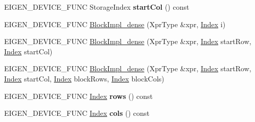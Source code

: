 \begin{DoxyCompactItemize}
\item 
\mbox{\label{class_eigen_1_1internal_1_1_block_impl__dense_afa5798a61fe753fb0ded7ec54b3d0812}} 
E\+I\+G\+E\+N\+\_\+\+D\+E\+V\+I\+C\+E\+\_\+\+F\+U\+NC Storage\+Index {\bfseries start\+Col} () const
\item 
E\+I\+G\+E\+N\+\_\+\+D\+E\+V\+I\+C\+E\+\_\+\+F\+U\+NC \hyperlink{class_eigen_1_1internal_1_1_block_impl__dense_af68c0eafb607bb884cfe507bee39052e}{Block\+Impl\+\_\+dense} (Xpr\+Type \&xpr, \hyperlink{namespace_eigen_a62e77e0933482dafde8fe197d9a2cfde}{Index} i)
\item 
E\+I\+G\+E\+N\+\_\+\+D\+E\+V\+I\+C\+E\+\_\+\+F\+U\+NC \hyperlink{class_eigen_1_1internal_1_1_block_impl__dense_aa77daae8d8aef85ce9445cfd23363cbf}{Block\+Impl\+\_\+dense} (Xpr\+Type \&xpr, \hyperlink{namespace_eigen_a62e77e0933482dafde8fe197d9a2cfde}{Index} start\+Row, \hyperlink{namespace_eigen_a62e77e0933482dafde8fe197d9a2cfde}{Index} start\+Col)
\item 
E\+I\+G\+E\+N\+\_\+\+D\+E\+V\+I\+C\+E\+\_\+\+F\+U\+NC \hyperlink{class_eigen_1_1internal_1_1_block_impl__dense_a187c7918e6f200bf1d7d9a9c2f608547}{Block\+Impl\+\_\+dense} (Xpr\+Type \&xpr, \hyperlink{namespace_eigen_a62e77e0933482dafde8fe197d9a2cfde}{Index} start\+Row, \hyperlink{namespace_eigen_a62e77e0933482dafde8fe197d9a2cfde}{Index} start\+Col, \hyperlink{namespace_eigen_a62e77e0933482dafde8fe197d9a2cfde}{Index} block\+Rows, \hyperlink{namespace_eigen_a62e77e0933482dafde8fe197d9a2cfde}{Index} block\+Cols)
\item 
\mbox{\label{class_eigen_1_1internal_1_1_block_impl__dense_a233bff1b2ba038272ba57891802c9b30}} 
E\+I\+G\+E\+N\+\_\+\+D\+E\+V\+I\+C\+E\+\_\+\+F\+U\+NC \hyperlink{namespace_eigen_a62e77e0933482dafde8fe197d9a2cfde}{Index} {\bfseries rows} () const
\item 
\mbox{\label{class_eigen_1_1internal_1_1_block_impl__dense_ad9029a68d176acb67683ad387343a318}} 
E\+I\+G\+E\+N\+\_\+\+D\+E\+V\+I\+C\+E\+\_\+\+F\+U\+NC \hyperlink{namespace_eigen_a62e77e0933482dafde8fe197d9a2cfde}{Index} {\bfseries cols} () const
\item 
\mbox{\label{class_eigen_1_1internal_1_1_block_impl__dense_a1e50e8322ff5af7141c45eacbeaf86cd}} 

\end{DoxyCompactItemize}

